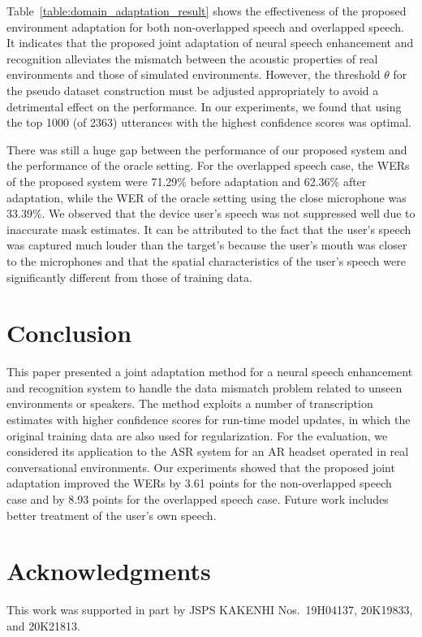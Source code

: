 \documentclass[a4paper]{article}
\begin{document}
Table~\ref{table:domain_adaptation_result} shows
the effectiveness of the proposed environment adaptation
for both non-overlapped speech and overlapped speech.
It indicates that the proposed joint adaptation of neural speech enhancement and recognition 
alleviates the mismatch between the acoustic properties of real environments
and those of simulated environments.
However, the threshold $\theta$ for the pseudo dataset construction
must be adjusted appropriately
to avoid a detrimental effect on the performance.
In our experiments, we found that using the top 1000 (of 2363) utterances with the highest confidence scores was optimal.

There was still a huge gap between the performance of our proposed system and the performance of the oracle setting.
For the overlapped speech case,
the WERs of the proposed system were 71.29\% before adaptation
and 62.36\% after adaptation, while
the WER of the oracle setting using the close microphone was 33.39\%.
We observed that the device user's speech was not suppressed well due to inaccurate mask estimates.
It can be attributed to the fact
that the user's speech was captured much louder than the target's because the user's mouth was closer to the microphones and
that the spatial characteristics of the user's speech were significantly different from those of training data.

\section{Conclusion}
\label{sec:conclusion}

This paper presented a joint adaptation method
 for a neural speech enhancement and recognition system
 to handle the data mismatch problem related to unseen environments or speakers.
The method exploits a number of transcription estimates 
 with higher confidence scores for run-time model updates,
 in which the original training data are also used for regularization.
For the evaluation, we considered its application
 to the ASR system for an AR headset 
 operated in real conversational environments.
Our experiments showed that
the proposed joint adaptation improved
the WERs by 3.61 points for the non-overlapped speech case
and by 8.93 points for the overlapped speech case.
Future work includes better treatment of the user's own speech.

\section{Acknowledgments}

This work was supported in part 
by JSPS KAKENHI Nos.~19H04137, 20K19833, and 20K21813.

\clearpage


\end{document}
